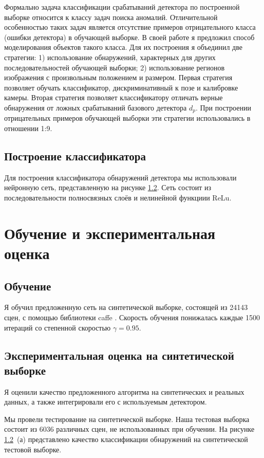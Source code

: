 Формально задача классификации срабатываний детектора по построенной выборке относится к классу задач поиска аномалий. Отличительной особенностью таких задач является отсутствие примеров отрицательного класса (ошибки детектора) в обучающей выборке. В своей работе я предложил способ моделирования объектов такого класса. Для их построения я объединил две стратегии: 1) использование обнаружений, характерных для других последовательностей обучающей выборки; 2) использование регионов изображения с произвольным положением и размером. Первая стратегия позволяет обучать классификатор, дискриминативный к позе и калибровке камеры. Вторая стратегия позволяет классификатору отличать верные обнаружения от ложных срабатываний базового детектора $d_p$. При построении отрицательных примеров обучающей выборки эти стратегии использовались в отношении 1:9.

\subsection{Построение классификатора}

Для построения классификатора обнаружений детектора мы использовали нейронную сеть, представленную на рисунке \ref{}. Сеть состоит из последовательности полносвязных слоёв и нелинейной функциии ReLu.

\section{Обучение и экспериментальная оценка}

\subsection{Обучение}

Я обучил предложенную сеть на синтетической выборке, состоящей из 24143 сцен, с помощью библиотеки caffe \cite{jia2014caffe}. Скорость обучения понижалась каждые 1500 итераций со степенной скоростью $\gamma = 0.95$.

\subsection{Экспериментальная оценка на синтетической выборке}

Я оценили качество предложенного алгоритма на синтетических и реальных данных, а также интегрировали его с используемым детектором.

Мы провели тестирование на синтетической выборке. Наша тестовая выборка состоит из 6036 различных сцен, не использованных при обучении. На рисунке \ref{}~(а) представлено качество классификации обнаружений на синтетической тестовой выборке. 

